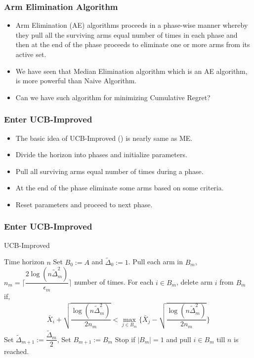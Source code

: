 \begin{frame}
\frametitle{Arm Elimination Algorithm}
\begin{itemize}
\item<1-> Arm Elimination (AE) algorithms proceeds in a phase-wise manner whereby they pull all the surviving arms equal number of times in each phase and then at the end of the phase proceeds to eliminate one or more arms from its active set. 
\item<2-> We have seen that Median Elimination algorithm which is an AE algorithm, is more powerful than Naive Algorithm.
\item<3-> Can we have such algorithm for minimizing Cumulative Regret?
\end{itemize}
\end{frame}

\begin{frame}
\frametitle{Enter UCB-Improved}
\begin{itemize}
\item<1-> The basic idea of UCB-Improved (\cite{auer2010ucb}) is nearly same as ME.
\item<2-> Divide the horizon into phases and initialize parameters.
\item<3-> Pull all surviving arms equal number of times during a phase.
\item<4-> At the end of the phase eliminate some arms based on some criteria.
\item<5-> Reset parameters and proceed to next phase.
\end{itemize}
\end{frame}

\begin{frame}
\frametitle{Enter UCB-Improved}
\begin{algorithm}[H]
\caption{UCB-Improved}
\begin{algorithmic}[1]
 Time horizon $n$
 Set $B_{0}:=A$ and $\tilde{\Delta}_{0}:=1$.
\State Pull each arm in $B_m$, $n_{m}=\bigg\lceil\dfrac{2\log{( n\tilde{\Delta}_{m}^{2})}}{\epsilon_{m}}\bigg\rceil$ number of times.
\ArmElim
\State For each $i \in B_{m}$, delete arm ${i}$ from $B_{m}$ if,
\begin{align*}
\bar{X}_{i} + \sqrt{\dfrac{\log{(n\tilde{\Delta}_{m}^{2})}}{2 n_{m}}}  < \max_{{j}\in B_{m}}\bigg\lbrace\bar{X}_{j} -\sqrt{\dfrac{\log{( n\tilde{\Delta}_{m}^{2})}}{2 n_{m}}} \bigg\rbrace
\end{align*}
\EndArmElim
\State Set $\tilde{\Delta}_{m+1}:=\dfrac{\tilde{\Delta}_{m}}{2}$, Set $B_{m+1}:=B_{m}$
\State Stop if $|B_{m}|=1$ and pull ${i}\in B_{m}$ till $n$ is reached.
\EndFor
\end{algorithmic}
\end{algorithm}
\end{frame}

